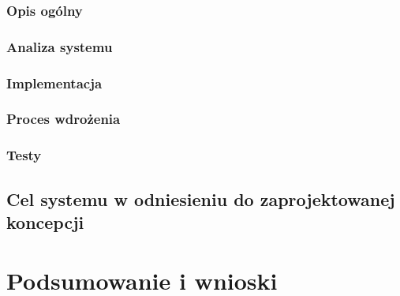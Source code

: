 \subsection{Opis ogólny}
\subsection{Analiza systemu}
\subsection{Implementacja}
\subsection{Proces wdrożenia}
\subsection{Testy}
\section{Cel systemu w odniesieniu do zaprojektowanej koncepcji}
\chapter{Podsumowanie i wnioski}

